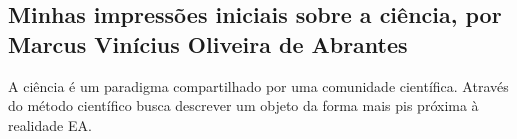 \subsection{Minhas impressões iniciais sobre a ciência, por Marcus Vinícius Oliveira de Abrantes}

A ciência é um \gls{paradigma} compartilhado por uma comunidade científica.  Através do método científico \citep{fastformat_o_2018} busca descrever um objeto da forma mais pis próxima à realidade
\gls{EA}.